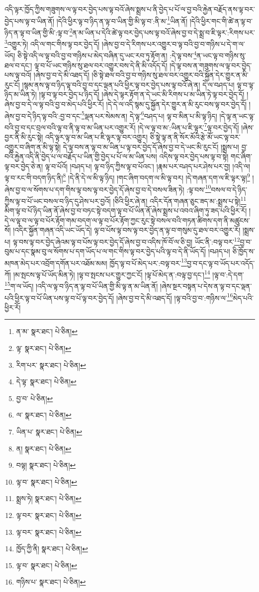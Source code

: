 འདི་ལྟར་ཁྱོད་ཀྱིས་གཟུགས་ལ་ལྟ་བར་བྱེད་པས་ལྟ་བའོ་ཞེས་སྨྲས་པ་ནི་བྱེད་པ་པོ་ལ་བྱ་བའི་རྐྱེན་བརྗོད་ནས་ལྟ་བར་བྱེད་པས་ལྟ་བ་ཡིན་ནོ། །དེའི་ཕྱིར་ལྟ་བ་ཉིད་ན་ལྟ་བ་ཡིན་གྱི་མི་ལྟ་བ་:ནི་མ་\footnote{ན་མ་  སྣར་ཐང་།  པེ་ཅིན། }ཡིན་ནོ། །དེའི་ཕྱིར་གང་གི་ཚེ་ན་ལྟ་བ་ཉིད་ན་ལྟ་བ་ཡིན་གྱི་མི་:ལྟ་བ་\footnote{ལྟ་  སྣར་ཐང་།  པེ་ཅིན། }ན་མ་ཡིན་པ་དེའི་ཚེ་ལྟ་བར་བྱེད་པས་ལྟ་བའོ་ཞེས་བྱ་བ་དེ་སྨྲ་བ་ཇི་ལྟར་:རིགས་པར་\footnote{རིག་པར་  སྣར་ཐང་།  པེ་ཅིན། }འགྱུར་ཏེ། འདི་ལ་གང་གིས་ལྟ་བར་བྱེད་དོ། །ཞེས་བྱ་བ་དེ་རིགས་པར་འགྱུར་བ་ལྟ་བའི་བྱ་བ་གཉིས་པ་དེ་ག་ལ་ཡོད། ཅི་སྟེ་འདི་ལ་ལྟ་བའི་བྱ་བ་གཉིས་པ་མེད་བཞིན་དུ་ཡང་རབ་ཏུ་རྟོག་ན། :དེ་ལྟ་བས་\footnote{དེ་ལྟ་  སྣར་ཐང་།  པེ་ཅིན། }ན་ཡང་ལྟ་བ་གཉིས་སུ་ཐལ་བ་དང་། ལྟ་བ་པོ་ཡང་གཉིས་སུ་ཐལ་བར་འགྱུར་བས་དེ་ནི་མི་འདོད་དོ། །དེ་ལྟ་བས་ན་གཟུགས་ལ་ལྟ་བར་བྱེད་པས་ལྟ་བའོ། །ཞེས་བྱ་བ་དེ་མི་འཐད་དོ། །ཅི་སྟེ་ཐལ་བའི་བྱ་བ་གཉིས་སུ་ཐལ་བར་འགྱུར་བའི་སྐྱོན་དེར་གྱུར་ན་མི་རུང་ངོ། །སྙམ་ནས་ལྟ་བ་ཉིད་ལྟ་བའི་བྱ་བ་དང་ལྡན་པའི་ཕྱིར་ལྟ་བར་བྱེད་པས་ལྟ་བའོ་ཞེ་ན། དེ་ལ་བཤད་པ། ལྟ་བ་ལྟ་ཉིད་མ་ཡིན་ཏེ། །ལྟ་བ་ལྟ་བར་བྱེད་པ་ཉིད་དོ། །ཞེས་དེ་ལྟར་རྟོག་ན་དེ་ཡང་མི་རིགས་པ་མ་ཡིན་ཏེ་ལྟ་བར་བྱེད་དོ། །ཞེས་བྱ་བ་དེ་ལ་ལྟ་བའི་བྱ་བ་མེད་པའི་ཕྱིར་རོ། །དེ་དེ་ལ་འདི་སྙམ་དུ་སྐྱོན་དེར་གྱུར་ན་མི་རུང་བས་ལྟ་བར་བྱེད་དོ། །ཞེས་བྱ་བ་དེ་ཉིད་ལྟ་བའི་:བྱ་བ་དང་\footnote{བྱ་བ་  པེ་ཅིན། }ལྡན་པར་སེམས་ན། དེ་ལྟ་\footnote{ལ་  སྣར་ཐང་།  པེ་ཅིན། }བཤད་པ། ལྟ་བ་མིན་པ་མི་ལྟ་ཉིད། །དེ་ལྟ་ན་ཡང་ལྟ་བའི་བྱ་བ་དང་བྲལ་བའི་ལྟ་བ་ནི་ལྟ་བ་མ་ཡིན་པར་འགྱུར་རོ། །དེ་ལ་ལྟ་བ་མ་:ཡིན་པ་ཇི་ལྟར་\footnote{ཡིན་པ་  སྣར་ཐང་།  པེ་ཅིན། }ལྟ་བར་བྱེད་དོ། །ཞེས་བྱར་ནི་མི་རུང་སྟེ། འདི་ལྟར་ལྟ་བ་མ་ཡིན་པ་ཇི་ལྟར་ལྟ་བར་འགྱུར། ཅི་སྟེ་ལྟ་ན་ནི་སོར་མོའི་རྩེ་མོ་ཡང་ལྟ་བར་འགྱུར་བ་ཞིག་ན་མི་ལྟ་སྟེ། དེ་ལྟ་བས་ན་ལྟ་བ་མ་ཡིན་པ་ལྟ་བར་བྱེད་དོ་ཞེས་བྱ་བ་དེ་ཡང་མི་རུང་ངོ། །སྨྲས་པ། བྱ་བའི་རྐྱེན་འདི་ནི་བྱེད་པ་ལ་བརྗོད་པ་ཡིན་གྱི་བྱེད་པ་པོ་ལ་མ་ཡིན་པས། འདིས་ལྟ་བར་བྱེད་པས་ལྟ་བ་སྟེ། གང་ཞིག་ལྟ་བར་བྱེད་ཅེ་ན། ལྟ་བ་པོའོ། །བཤད་པ། ལྟ་བ་ཉིད་ཀྱིས་ལྟ་བ་པོའང་། །རྣམ་པར་བཤད་པར་ཤེས་པར་བྱ། །འདི་ལ། ལྟ་བ་རང་གི་བདག་ཉིད་ནི།\footnote{ན།  སྣར་ཐང་།  པེ་ཅིན། } །དེ་ནི་དེ་ལ་མི་ལྟ་ཉིད། །གང་ཞིག་བདག་ལ་མི་ལྟ་བར། །དེ་གཞན་དག་ལ་ཇི་ལྟར་ལྟ།\footnote{བལྟ།  སྣར་ཐང་།  པེ་ཅིན། } །ཞེས་བྱ་བ་ལ་སོགས་པ་དག་གིས་ལྟ་བས་ལྟ་བར་བྱེད་དོ་ཞེས་བྱ་བ་དེ་བསལ་ཟིན་ཏེ། :ལྟ་བས་\footnote{ལྟ་བ་  སྣར་ཐང་།  པེ་ཅིན། }བསལ་བ་དེ་ཉིད་ཀྱིས་ལྟ་བ་པོ་ཡང་བསལ་བ་ཉིད་དུ་ཤེས་པར་བྱའོ། །ཅིའི་ཕྱིར་ཞེ་ན། འདིར་དོན་གཞན་ཅུང་ཟད་མ་:སྨྲས་པ་སྟེ།\footnote{སྨྲས་ཏེ།  སྣར་ཐང་།  པེ་ཅིན། } མིག་ལྟ་བ་པོ་ཉིད་ཡིན་ནོ་ཞེས་བྱ་བ་བཏང་སྟེ་བདག་ལྟ་བ་པོ་ཡིན་ནོ་ཞེས་སྨྲས་པ་འབའ་ཞིག་ཏུ་ཟད་པའི་ཕྱིར་རོ། །དེ་ལ་ལྟ་བ་ལ་ལྟ་བ་པོར་རྟོག་གམ་བདག་ལ་ལྟ་བ་པོར་རྟོག་ཀྱང་རུང་སྟེ་བསལ་བའི་གཏན་ཚིགས་དག་ནི་མཚུངས་སོ། །འདིར་སྐྱོན་གཞན་འདི་ཡང་ཡོད་དེ། ལྟ་བ་པོས་ལྟ་བས་ལྟ་བར་བྱེད་ན་ལྟ་བ་གསུམ་དུ་ཐལ་བར་འགྱུར་རོ། །སྨྲས་པ། ལྟ་བས་ལྟ་བར་བྱེད་ཞེའམ་ལྟ་བ་པོས་ལྟ་བར་བྱེད་དོ་ཞེས་བྱ་བ་འདིས་ཁོ་བོ་ལ་ཅི་བྱ། ཡོང་ནི་:བལྟ་བར་\footnote{ལྟ་བར་  སྣར་ཐང་།  པེ་ཅིན། }བྱ་བ་བུམ་པ་དང་སྣམ་བུ་ལ་སོགས་པ་དག་ཡོད་པ་ལ་གང་གིས་ལྟ་བར་བྱེད་པའི་ལྟ་བ་དེ་ནི་ཡོད་དོ། །བཤད་པ། ཅི་ཁྱོད་ས་མཁན་མེད་པར་འབྲོག་དགོན་པར་འཐོམ་མམ། ཁྱོད་ལྟ་བ་པོ་མེད་པར་:བལྟ་བར་\footnote{ལྟ་བར་  སྣར་ཐང་།  པེ་ཅིན། }བྱ་བ་དང་ལྟ་བ་ཡོད་པར་འདོད་ཀོ། །མ་སྤངས་ལྟ་པོ་ཡོད་མིན་ཏེ། །ལྟ་བ་སྤངས་པར་གྱུར་ཀྱང་ངོ། །ལྟ་པོ་མེད་ན་:བལྟ་བྱ་དང་།\footnote{ཁྱོད་ཀྱི་ནི།  སྣར་ཐང་།  པེ་ཅིན། } །ལྟ་བ་:དེ་དག་\footnote{ལྟ་བ་  སྣར་ཐང་།  པེ་ཅིན། }ག་ལ་ཡོད། །འདི་ལ་ལྟ་བ་ཉིད་ན་ལྟ་བ་པོ་ཡིན་གྱི་མི་ལྟ་ན་མ་ཡིན་ནོ། །ཞེས་སྔར་བསྟན་པ་དེས་ན་ལྟ་བ་དང་ལྡན་པའི་ཕྱིར་ལྟ་བ་པོ་ཡིན་པས་ལྟ་བ་པོ་ལྟ་བར་བྱེད་དོ། །ཞེས་བྱ་བ་དེ་མི་འཐད་དོ། །ལྟ་བའི་བྱ་བ་:གཉིས་ལ་\footnote{གཉིས་པ་  སྣར་ཐང་།  པེ་ཅིན། }མེད་པའི་ཕྱིར་རོ། 